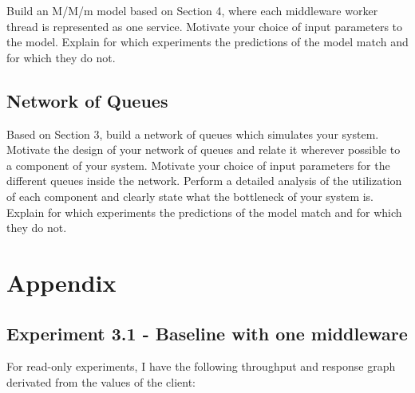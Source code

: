 \documentclass[11pt,a4paper]{article}
\begin{document}
Build an M/M/m model based on Section 4, where each middleware worker thread is represented as one service.  Motivate your choice of input parameters to the model. Explain for which experiments the predictions of the model match and for which they do not.

\subsection{Network of Queues}

Based on Section 3, build a network of queues which simulates your system. Motivate the design of your network of queues and relate it wherever possible to a component of your system. Motivate your choice of input parameters for the different queues inside the network. Perform a detailed analysis of the utilization of each component and clearly state what the bottleneck of your system is. Explain for which experiments the predictions of the model match and for which they do not.

\section{Appendix}

\subsection{Experiment 3.1 - Baseline with one middleware}
For read-only experiments, I have the following throughput and response graph derivated from the values of the client:
\end{document}

